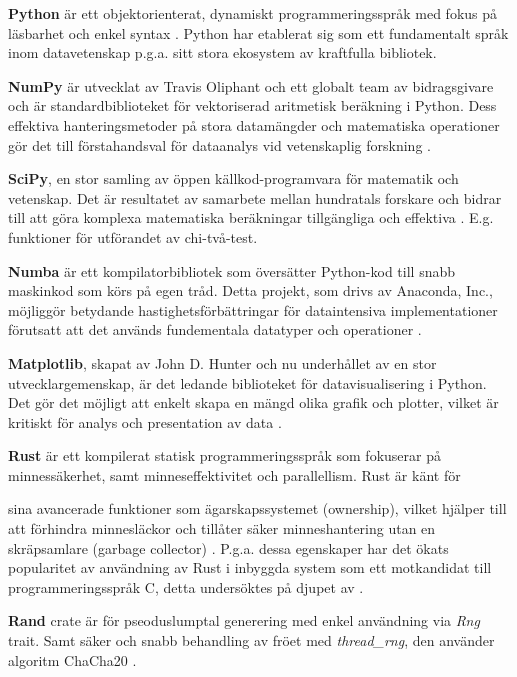 \documentclass[swedish,a4paper]{article}
\begin{document}
\textbf{Python} är ett objektorienterat, dynamiskt programmeringsspråk 
med fokus på läsbarhet och enkel syntax \parencite{python}. Python
har etablerat sig som ett fundamentalt språk inom datavetenskap p.g.a. sitt
stora ekosystem av kraftfulla \gls{bibliotek}. 

\textbf{NumPy} är utvecklat av Travis Oliphant och ett globalt team av
bidragsgivare och är standardbiblioteket för vektoriserad aritmetisk beräkning i
Python. Dess effektiva hanteringsmetoder på stora datamängder och matematiska
operationer gör det till förstahandsval för dataanalys vid vetenskaplig
forskning \parencite{numpy}.

\textbf{SciPy}, en stor samling av öppen källkod-programvara för matematik och
vetenskap. Det är resultatet av samarbete mellan hundratals forskare och bidrar
till att göra komplexa matematiska beräkningar tillgängliga och effektiva
\parencite{scipy}. E.g. funktioner för utförandet av chi-två-test.

\textbf{Numba} är ett kompilatorbibliotek som översätter Python-kod till snabb maskinkod som körs på egen tråd. Detta projekt, som drivs av Anaconda, Inc.,
möjliggör betydande hastighetsförbättringar för dataintensiva implementationer 
förutsatt att det används fundementala datatyper och operationer \parencite{numba}.  

\textbf{Matplotlib}, skapat av John D. Hunter och nu underhållet av en stor
utvecklargemenskap, är det ledande biblioteket för datavisualisering i Python.
Det gör det möjligt att enkelt skapa en mängd olika grafik och plotter, vilket
är kritiskt för analys och presentation av data \textcite{matplotlib}.

\textbf{Rust} är ett kompilerat statisk programmeringsspråk som fokuserar på
minnessäkerhet, samt minneseffektivitet och parallellism. Rust är känt för

sina avancerade funktioner som ägarskapssystemet (ownership), vilket
hjälper till att förhindra minnesläckor och tillåter säker
minneshantering utan en skräpsamlare (garbage collector)
\parencite{rust}. 
P.g.a. dessa egenskaper har det ökats popularitet av användning av Rust i
inbyggda system som ett motkandidat till programmeringsspråk C, detta  undersöktes
 på djupet av \textcite{sharma2023rust}.

\textbf{Rand} \gls{crate} är för pseoduslumptal generering med enkel användning
via \textit{Rng} trait. Samt säker och snabb behandling av fröet med
\textit{thread\_rng}, den använder algoritm ChaCha20 \parencite{rand_crate}.
\end{document}
